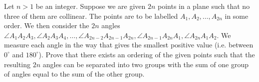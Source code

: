 Let $n > 1$ be an integer. Suppose we are given $2n$ points in a plane such that no three of them are collinear. The points are to be labelled $A_1, A_2, \ldots, A_{2n}$ in some order. We then consider the $2n$ angles $\angle A_1A_2A_3, \angle A_2A_3A_4, \ldots, \angle A_{2n-2}A_{2n-1}A_{2n}, \angle A_{2n-1}A_{2n}A_1, \angle A_{2n}A_1A_2$. We measure each angle in the way that gives the smallest positive value (i.e. between $0^\circ$ and $180^\circ$). Prove that there exists an ordering of the given points such that the resulting $2n$ angles can be separated into two groups with the sum of one group of angles equal to the sum of the other group.
